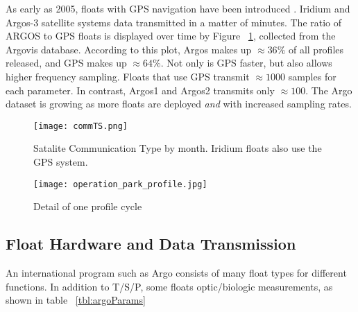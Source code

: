 As early as 2005, floats with GPS navigation have been introduced \cite{argo_man}. Iridium and Argos-3 satellite systems data transmitted in a matter of minutes. The ratio of ARGOS to GPS floats is displayed over time by Figure ~\ref{fig:commTS}, collected from the Argovis database. According to this plot, Argos makes up $\approx 36\%$ of all profiles released, and GPS makes up $\approx 64\%$. Not only is GPS faster, but also allows higher frequency sampling. Floats that use GPS transmit $\approx 1000$ samples for each parameter. In contrast, Argos1 and Argos2 transmits only $\approx 100$. The Argo dataset is growing as more floats are deployed \textit{and} with increased sampling rates.

\begin{figure}[ht]
  \centering
  \begin{minipage}{4.5in}
    \texttt{[image: commTS.png]}
    \caption{ \label{fig:commTS} Satalite Communication Type by month. Iridium floats also use the GPS system.}
  \end{minipage}
\end{figure}

\begin{figure}[ht]
  \centering
  \begin{minipage}{4.5in}
    \texttt{[image: operation\_park\_profile.jpg]}
    \caption{ \label{fig:argo_cycle} Detail of one profile cycle\cite{argo}}
  \end{minipage}
\end{figure}

\subsection{Float Hardware and Data Transmission}

An international program such as Argo consists of many float types for different functions. In addition to T/S/P, some floats optic/biologic measurements, as shown in table ~\ref{tbl:argoParams}


